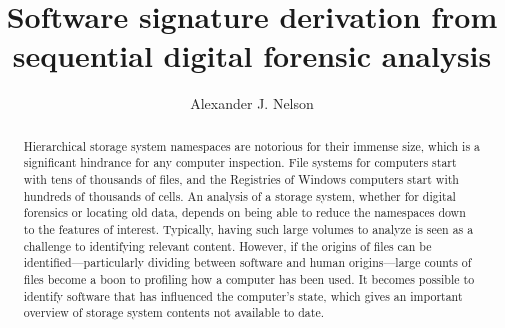\documentclass[11pt]{ucthesis}
\theoremstyle{plain}
\theoremstyle{definition}
\begin{document}

\title{Software signature derivation from sequential digital forensic analysis}
\author{Alexander J. Nelson}
\deanlinethree{}

\begin{frontmatter}


\maketitle


\copyrightpage


\tableofcontents


\listoffigures


\listoftables


\begin{abstract}
Hierarchical storage system namespaces are notorious for their immense size, which is a significant hindrance for any computer inspection.  File systems for computers start with tens of thousands of files, and the Registries of Windows computers start with hundreds of thousands of cells.  An analysis of a storage system, whether for digital forensics or locating old data, depends on being able to reduce the namespaces down to the features of interest.  Typically, having such large volumes to analyze is seen as a challenge to identifying relevant content.  However, if the origins of files can be identified---particularly dividing between software and human origins---large counts of files become a boon to profiling how a computer has been used.  It becomes possible to identify software that has influenced the computer's state, which gives an important overview of storage system contents not available to date.


\end{abstract}
\end{frontmatter}
\end{document}
